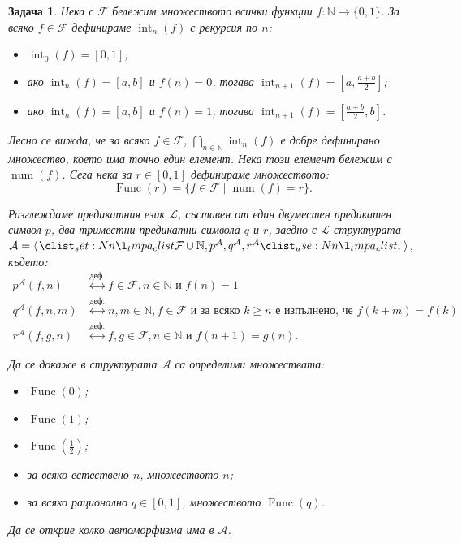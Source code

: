 \documentclass[12pt]{article}
\newcommand{\N}{\mathbb{N}}
\newcommand{\calA}{\mathcal{A}}
\newcommand{\calL}{\mathcal{L}}
\newcommand{\calF}{\mathcal{F}}
\newcommand{\dequiv}{\stackrel{\text{деф.}}{\longleftrightarrow}}
\newtheorem{problem}{Задача}[section]
\theoremstyle{definition}
\begin{document}
\newpage

\begin{problem}
Нека с $\calF$ бележим множеството всички функции $f: \N \rightarrow \{ 0, 1 \}$.
За всяко $f \in \calF$ дефинираме $\operatorname{int}_n(f)$ с рекурсия по $n$:
\begin{itemize}
    \item $\operatorname{int}_0(f) = [0, 1]$;
    \item ако $\operatorname{int}_n(f) = [a, b]$ и $f(n) = 0$, тогава $\operatorname{int}_{n + 1}(f) = [a, \frac{a + b}{2}]$;
    \item ако $\operatorname{int}_n(f) = [a, b]$ и $f(n) = 1$, тогава $\operatorname{int}_{n + 1}(f) = [\frac{a + b}{2}, b]$.
\end{itemize}
Лесно се вижда, че за всяко $f \in \calF$, $\bigcap\limits_{n \in \N} \operatorname{int}_n(f)$ е добре дефинирано множество, което има точно един елемент.
Нека този елемент бележим с $\operatorname{num}(f)$.
Сега нека за $r \in [0, 1]$ дефинираме множеството:
\[
    \operatorname{Func}(r) = \{ f \in \calF \mid \operatorname{num}(f) = r \}.
\]

Разглеждаме предикатния език $\calL$, съставен от един двуместен предикатен символ $p$, два триместни предикатни символа $q$ и $r$, заедно с $\calL$-структурата $\calA = \opair{\calF \cup \N, p^\calA, q^\calA, r^\calA}$, където:
\begin{align*}
    p^\calA(f, n)    & \dequiv f \in \calF, n \in \N \text{ и } f(n) = 1                                                      \\
    q^\calA(f, n, m) & \dequiv n, m \in \N, f \in \calF \text{ и за всяко } k \geq n \text{ е изпълнено, че } f(k + m) = f(k) \\
    r^\calA(f, g, n) & \dequiv f, g \in \calF, n \in \N \text{ и } f(n + 1) = g(n).
\end{align*}

Да се докаже в структурата $\calA$ са определими множествата:
\begin{itemize}
    \item[а)] $\operatorname{Func}(0)$;
    \item[б)] $\operatorname{Func}(1)$;
    \item[в)] $\operatorname{Func}(\frac{1}{2})$;
    \item[г)] за всяко естествено $n$, множеството $n$;
    \item[д)] за всяко рационално $q \in [0, 1]$, множеството $\operatorname{Func}(q)$.
\end{itemize}
Да се открие колко автоморфизма има в $\calA$.
\end{problem}
\end{document}
